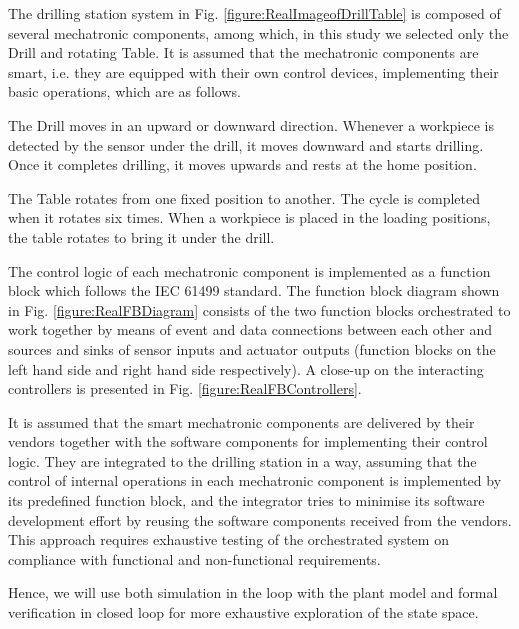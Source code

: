 \begin{bibunit}
The drilling station system in Fig. \ref{figure:RealImageofDrillTable} is composed of several mechatronic components, among which, in this study we selected only the Drill and rotating Table. 
It is assumed that the mechatronic components are smart, i.e. they are equipped with their own control devices, implementing their basic operations, which are as follows. 

The Drill moves in an upward or downward direction. Whenever a workpiece is detected by the sensor under the drill, it moves downward and starts drilling. Once it completes drilling, it moves upwards and rests at the home position. 

The Table rotates from one fixed position to another. The cycle is completed when it rotates six times. 
When a workpiece is placed in the loading positions, the table rotates to bring it under the drill.

The control logic of each mechatronic component is implemented as a function block which follows the IEC 61499 standard. The function block diagram shown in Fig. \ref{figure:RealFBDiagram} consists of the two function blocks orchestrated to work together by means of event and data connections between each other and sources and sinks of sensor inputs and actuator outputs (function blocks on the left hand side and right hand side respectively). A close-up on the interacting controllers is presented in Fig. \ref{figure:RealFBControllers}.

It is assumed that the smart mechatronic components are delivered by their vendors together with the software components for implementing their control logic. They are integrated to the drilling station in a way, assuming that the control of internal operations in each mechatronic component is implemented by its predefined function block, and the integrator tries to minimise its software development effort by reusing the software components received from the vendors.
This approach requires exhaustive testing of the orchestrated system on compliance with functional and non-functional requirements. 

Hence, we will use both simulation in the loop with the plant model and formal verification in closed loop for more exhaustive exploration of the state space. 


\end{bibunit}
